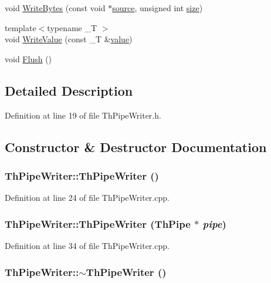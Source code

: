 \begin{CompactItemize}
void \hyperlink{class_th_pipe_writer_e54cf707b37055a566eb4dbab7b72091}{WriteBytes} (const void $\ast$\hyperlink{glext__bak_8h_fd3b198d09b41a863127e5e2b29c4e53}{source}, unsigned int \hyperlink{glext__bak_8h_3d1e3edfcf61ca2d831883e1afbad89e}{size})
\item 
{\footnotesize template$<$typename \_\-T $>$ }\\void \hyperlink{class_th_pipe_writer_dd6200799026cc86186a2e400fbe297c}{WriteValue} (const \_\-T \&\hyperlink{glext__bak_8h_6a4f8a1a444e9080b297963b3db29fe0}{value})
\item 
void \hyperlink{class_th_pipe_writer_8efce3bace1019be225d62676c0e5f92}{Flush} ()
\end{CompactItemize}


\subsection{Detailed Description}


Definition at line 19 of file ThPipeWriter.h.

\subsection{Constructor \& Destructor Documentation}
\hypertarget{class_th_pipe_writer_625c375f059493e23431af41145fda05}{
\subsubsection[{ThPipeWriter}]{\setlength{\rightskip}{0pt plus 5cm}ThPipeWriter::ThPipeWriter ()}}
\label{class_th_pipe_writer_625c375f059493e23431af41145fda05}




Definition at line 24 of file ThPipeWriter.cpp.\hypertarget{class_th_pipe_writer_b7958e63e01c34ac4721547113b7fe52}{
\subsubsection[{ThPipeWriter}]{\setlength{\rightskip}{0pt plus 5cm}ThPipeWriter::ThPipeWriter ({\bf ThPipe} $\ast$ {\em pipe})}}
\label{class_th_pipe_writer_b7958e63e01c34ac4721547113b7fe52}




Definition at line 34 of file ThPipeWriter.cpp.\hypertarget{class_th_pipe_writer_7126b2eac1d1e8c627326093146ad39e}{
\subsubsection[{$\sim$ThPipeWriter}]{\setlength{\rightskip}{0pt plus 5cm}ThPipeWriter::$\sim$ThPipeWriter ()}}
\label{class_th_pipe_writer_7126b2eac1d1e8c627326093146ad39e}




